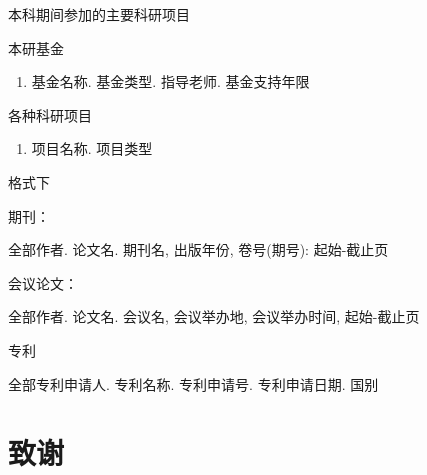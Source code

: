 \documentclass[UTF8,openany,AutoFakeBold,AutoFakeSlant,cs4size]{ctexbook}
\begin{document}
\noindent 本科期间参加的主要科研项目

\noindent 本研基金
\begin{enumerate}
	\item 基金名称. 基金类型. 指导老师. 基金支持年限
\end{enumerate}

\noindent 各种科研项目
\begin{enumerate}
	\item 项目名称. 项目类型
\end{enumerate}

格式下

期刊：

全部作者. 论文名. 期刊名, 出版年份, 卷号(期号): 起始-截止页

会议论文：

全部作者. 论文名. 会议名, 会议举办地, 会议举办时间, 起始-截止页

专利

全部专利申请人. 专利名称. 专利申请号. 专利申请日期. 国别



{
	\fancyhf{}
	\fancyfoot[CO,CE]{~\thepage~}
	\renewcommand{\headrulewidth}{0.7pt}
	\renewcommand{\footrulewidth}{0pt}
}
\fancyhf{}
\fancyfoot[CO,CE]{~\thepage~}
\renewcommand{\headrulewidth}{0.7pt}
\renewcommand{\footrulewidth}{0pt}
\clearpage





\linespread{1.5}\selectfont
\normalsize
\chapter*{致谢}



{
	\fancyhf{}
	\fancyfoot[CO,CE]{~\thepage~}
	\renewcommand{\headrulewidth}{0.7pt}
	\renewcommand{\footrulewidth}{0pt}
}
\fancyhf{}
\fancyfoot[CO,CE]{~\thepage~}
\renewcommand{\headrulewidth}{0.7pt}
\renewcommand{\footrulewidth}{0pt}
\end{document}

